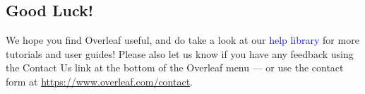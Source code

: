\documentclass{article}
\begin{document}
\subsection{Good Luck!}

We hope you find Overleaf useful, and do take a look at our \textcolor{blue}{help library} for more tutorials and user
guides! Please also let us know if you have any feedback using the Contact Us link at the bottom of
the Overleaf menu — or use the contact form at \textcolor{blue}{ \href{https://www.overleaf.com/contact}{https://www.overleaf.com/contact}}.


\cite{greenwade1993comprehensive}


\end{document}
